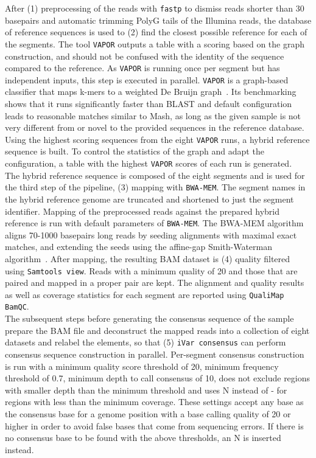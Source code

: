 After (1) preprocessing of the reads with \texttt{fastp} to dismiss reads shorter than 30 basepairs and automatic trimming PolyG tails of the Illumina reads, the database of reference sequences is used to (2) find the closest possible reference for each of the segments. The tool \texttt{VAPOR} outputs a table with a scoring based on the graph construction, and should not be confused with the identity of the sequence compared to the reference. As \texttt{VAPOR} is running once per segment but has independent inputs, this step is executed in parallel. \texttt{VAPOR} is a graph-based classifier that maps k-mers to a weighted De Bruijn graph~\cite{southgate2020influenza}. Its benchmarking shows that it runs significantly faster than \ac{BLAST} and default configuration leads to reasonable matches similar to Mash, as long as the given sample is not very different from or novel to the provided sequences in the reference database. \\
Using the highest scoring sequences from the eight \texttt{VAPOR} runs, a hybrid reference sequence is built. To control the statistics of the graph and adapt the configuration, a table with the highest \texttt{VAPOR} scores of each run is generated. \\
The hybrid reference sequence is composed of the eight segments and is used for the third step of the pipeline, (3) mapping with \texttt{BWA-MEM}. The segment names in the hybrid reference genome are truncated and shortened to just the segment identifier. Mapping of the preprocessed reads against the prepared hybrid reference is run with default parameters of \texttt{BWA-MEM}. The \ac{BWA-MEM} algorithm aligns 70-1000 basepairs long reads by seeding alignments with maximal exact matches, and extending the seeds using the affine-gap Smith-Waterman algorithm~\cite{li2013aligning}. After mapping, the resulting \ac{BAM} dataset is (4) quality filtered using \texttt{Samtools view}. Reads with a minimum quality of 20 and those that are paired and mapped in a proper pair are kept. The alignment and quality results as well as coverage statistics for each segment are reported using \texttt{QualiMap BamQC}. \\
The subsequent steps before generating the consensus sequence of the sample prepare the \ac{BAM} file and deconstruct the mapped reads into a collection of eight datasets and relabel the elements, so that (5) \texttt{iVar consensus} can perform consensus sequence construction in parallel. 
Per-segment consensus construction is run with a minimum quality score threshold of 20, minimum frequency threshold of 0.7, minimum depth to call consensus of 10, does not exclude regions with smaller depth than the minimum threshold and uses N instead of - for regions with less than the minimum coverage. These settings accept any base as the consensus base for a genome position with a base calling quality of 20 or higher in order to avoid false bases that come from sequencing errors. If there is no consensus base to be found with the above thresholds, an N is inserted instead. \\
